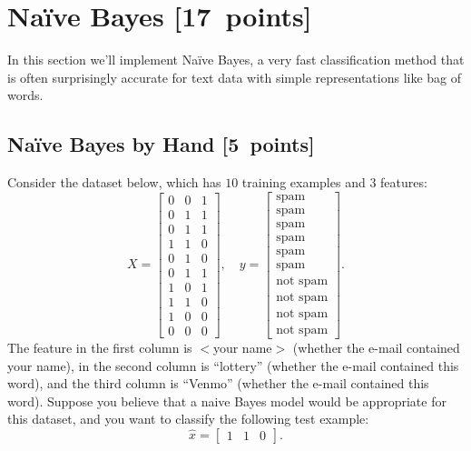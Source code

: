 \documentclass{article}
\newcommand\pts[1]{\textcolor{pointscolour}{[#1~points]}}
\begin{document}
    \clearpage
    \section{Na\"ive Bayes \pts{17}}

    In this section we'll implement Na\"ive Bayes, a very fast classification method that is often surprisingly accurate for text data with simple representations like bag of words.

    \subsection{Na\"ive Bayes by Hand \pts{5}}

    Consider the dataset below, which has $10$ training examples and $3$ features:
    \[
    X = \begin{bmatrix}
        0 & 0 & 1\\
        0 & 1 & 1\\
        0 & 1 & 1\\
        1 & 1 & 0\\
        0 & 1 & 0\\
        0 & 1 & 1\\
        1 & 0 & 1\\
        1 & 1 & 0\\
        1 & 0 & 0\\
        0 & 0 & 0
    \end{bmatrix},
    \quad y = \begin{bmatrix}
        \text{spam}\\
        \text{spam}\\
        \text{spam}\\
        \text{spam}\\
        \text{spam}\\
        \text{spam}\\
        \text{not spam}\\
        \text{not spam}\\
        \text{not spam}\\
        \text{not spam}
    \end{bmatrix}.
    \]
    The feature in the first column is $<$your name$>$ (whether the e-mail contained your name), in the second column is ``lottery'' (whether the e-mail contained this word), and the third column is ``Venmo'' (whether the e-mail contained this word).
    Suppose you believe that a naive Bayes model would be appropriate for this dataset, and you want to classify the following test example:
    \[
    \hat{x} = \begin{bmatrix}1 & 1 & 0\end{bmatrix}.
    \]
\end{document}
